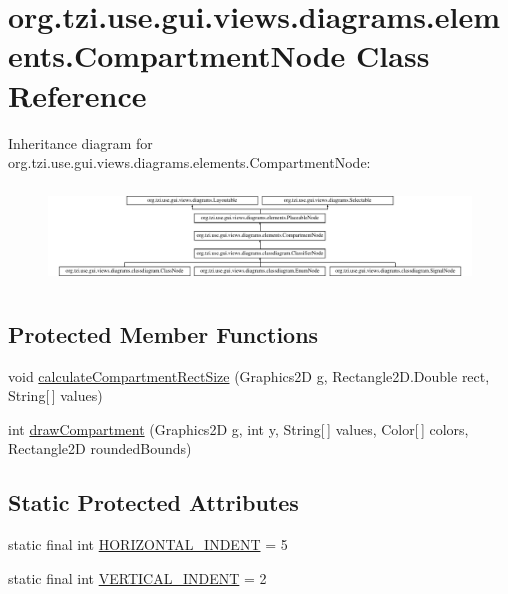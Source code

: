 \hypertarget{classorg_1_1tzi_1_1use_1_1gui_1_1views_1_1diagrams_1_1elements_1_1_compartment_node}{\section{org.\-tzi.\-use.\-gui.\-views.\-diagrams.\-elements.\-Compartment\-Node Class Reference}
\label{classorg_1_1tzi_1_1use_1_1gui_1_1views_1_1diagrams_1_1elements_1_1_compartment_node}
}
Inheritance diagram for org.\-tzi.\-use.\-gui.\-views.\-diagrams.\-elements.\-Compartment\-Node\-:\begin{figure}[H]
\begin{center}
\leavevmode
\includegraphics[height=2.621723cm]{classorg_1_1tzi_1_1use_1_1gui_1_1views_1_1diagrams_1_1elements_1_1_compartment_node}
\end{center}
\end{figure}
\subsection*{Protected Member Functions}
\begin{DoxyCompactItemize}
\item 
void \hyperlink{classorg_1_1tzi_1_1use_1_1gui_1_1views_1_1diagrams_1_1elements_1_1_compartment_node_a11a2ee5f2f26ed8303c34368ea083880}{calculate\-Compartment\-Rect\-Size} (Graphics2\-D g, Rectangle2\-D.\-Double rect, String\mbox{[}$\,$\mbox{]} values)
\item 
int \hyperlink{classorg_1_1tzi_1_1use_1_1gui_1_1views_1_1diagrams_1_1elements_1_1_compartment_node_a050236d418bf4c3af7f849e332740fc7}{draw\-Compartment} (Graphics2\-D g, int y, String\mbox{[}$\,$\mbox{]} values, Color\mbox{[}$\,$\mbox{]} colors, Rectangle2\-D rounded\-Bounds)
\end{DoxyCompactItemize}
\subsection*{Static Protected Attributes}
\begin{DoxyCompactItemize}
\item 
static final int \hyperlink{classorg_1_1tzi_1_1use_1_1gui_1_1views_1_1diagrams_1_1elements_1_1_compartment_node_acb5647fccfe4ffec27d36193ac92d39a}{H\-O\-R\-I\-Z\-O\-N\-T\-A\-L\-\_\-\-I\-N\-D\-E\-N\-T} = 5
\item 
static final int \hyperlink{classorg_1_1tzi_1_1use_1_1gui_1_1views_1_1diagrams_1_1elements_1_1_compartment_node_a5b7ceb98382947341031c07c168400ee}{V\-E\-R\-T\-I\-C\-A\-L\-\_\-\-I\-N\-D\-E\-N\-T} = 2
\end{DoxyCompactItemize}
